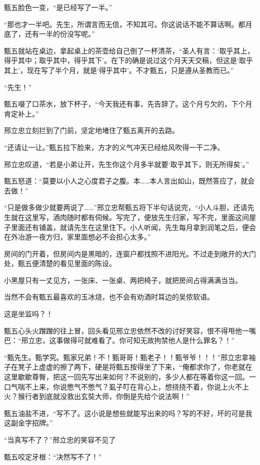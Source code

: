 甄五脸色一变，“是已经写了一半。”

“那也才一半吧。先生，所谓言而无信，不知其可。你这说话不能不算话啊。都月底了，还有一半的份没写呢。”

甄五就站在桌边，拿起桌上的茶壶给自己倒了一杯清茶，“圣人有言：‘取乎其上，得乎其中；取乎其中，得乎其下’。在下的确是说过这个月天天交稿，但这是‘取乎其上’，现在写了半个月，就是‘得乎其中’。不才甄五，只是遵从圣教而已。”

“先生！”

甄五啜了口茶水，放下杯子，“今天我还有事，先告辞了。这个月亏欠的，下个月肯定补上。”

邢立忠立刻拦到了门前，坚定地堵住了甄五离开的去路。

“还请让一让。”甄五拉下脸来，方才的义气冲天已经给风吹得一干二净。

邢立忠叹道，“若是小弟让开，先生你这个月多半就要‘取乎其下，则无所得矣’。”

甄五怒道：“莫要以小人之心度君子之腹。本……本人言出如山，既然答应了，就会去做！”

“只是做多做少就要两说了……”邢立忠帮甄五将下半句话说完，“小人斗胆，还请先生就在这里写，酒肉随时都有伺候。写完了，便放先生归家，写不完，里面这间屋子里面还有铺盖，就请先生在这里住下。小人听闻，先生每月拿到润笔之后，便会在外冶游一夜方归，家里面想必不会担心太多。”

房间的门开着，但房间内是黑暗的，连窗户都找照不进阳光。不过走到敞开的大门处，甄五便清楚的看见里面的陈设。

小黑屋只有一丈见方，一张床、一张桌、两把椅子，就把房间占得满满当当。

当然不会有甄五最喜欢的玉冰烧，也不会有劝酒时耳边的吴侬软语。

这是坐监吗？！

甄五心头火蹭蹭的往上冒，回头看见邢立忠依然不改的讨好笑容，恨不得甩他一嘴巴：“邢立忠，这事做得可就难看了。你可知无故拘禁他人是什么罪名？！”

“甄先生。甄学究。甄家兄弟！不！甄哥哥！甄老子！！甄爷爷！！！”邢立忠拿袖子在凳子上虚虚的擦了两下，硬是将甄五按得坐了下来，“俺都求你了，你老就在这里歇歇尊臀，把这一回先写出来如何？不说别的，多少人都在等着你这一回。一口气喘不上来，你说憋气不憋气？虱子叮在背心上，想挠挠不着，你说上火不上火？猴行者到底就没救出玄奘大师，你倒是先给个说法啊！”

甄五油盐不进，“写不了。这小说是想些就能写出来的吗？写的不好，坏的可是我这副金字招牌。”

“当真写不了？”邢立忠的笑容不见了

甄五咬定牙根：“决然写不了！”

